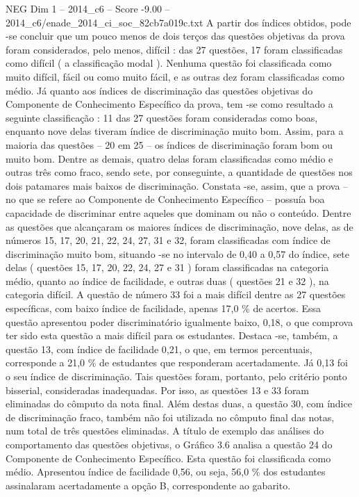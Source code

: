 \begin{textsample}{NEG Dim 1 – 2014\_c6 – Score -9.00 – 2014\_c6/enade\_2014\_ci\_soc\_82cb7a019c.txt}
A partir dos índices obtidos, pode -se concluir que um pouco menos de dois terços das questões objetivas da prova foram considerados, pelo menos, difícil : das 27 questões, 17 foram classificadas como difícil ( a classificação modal ).
Nenhuma questão foi classificada como muito difícil, fácil ou como muito fácil, e as outras dez foram classificadas como médio.
Já quanto aos índices de discriminação das questões objetivas do Componente de Conhecimento Específico da prova, tem -se como resultado a seguinte classificação : 11 das 27 questões foram consideradas como boas, enquanto nove delas tiveram índice de discriminação muito bom.
Assim, para a maioria das questões – 20 em 25 – os índices de discriminação foram bom ou muito bom.
Dentre as demais, quatro delas foram classificadas como médio e outras três como fraco, sendo sete, por conseguinte, a quantidade de questões nos dois patamares mais baixos de discriminação.
Constata -se, assim, que a prova – no que se refere ao Componente de Conhecimento Específico – possuía boa capacidade de discriminar entre aqueles que dominam ou não o conteúdo.
Dentre as questões que alcançaram os maiores índices de discriminação, nove delas, as de números 15, 17, 20, 21, 22, 24, 27, 31 e 32, foram classificadas com índice de discriminação muito bom, situando -se no intervalo de 0,40 a 0,57 do índice, sete delas ( questões 15, 17, 20, 22, 24, 27 e 31 ) foram classificadas na categoria médio, quanto ao índice de facilidade, e outras duas ( questões 21 e 32 ), na categoria difícil.
A questão de número 33 foi a mais difícil dentre as 27 questões específicas, com baixo índice de facilidade, apenas 17,0 \% de acertos.
Essa questão apresentou poder discriminatório igualmente baixo, 0,18, o que comprova ter sido esta questão a mais difícil para os estudantes.
Destaca -se, também, a questão 13, com índice de facilidade 0,21, o que, em termos percentuais, corresponde a 21,0 \% de estudantes que responderam acertadamente.
Já 0,13 foi o seu índice de discriminação.
Tais questões foram, portanto, pelo critério ponto bisserial, consideradas inadequadas.
Por isso, as questões 13 e 33 foram eliminadas do cômputo da nota final.
Além destas duas, a questão 30, com índice de discriminação fraco, também não foi utilizada no cômputo final das notas, num total de três questões eliminadas.
A título de exemplo das análises do comportamento das questões objetivas, o Gráfico 3.6 analisa a questão 24 do Componente de Conhecimento Específico.
Esta questão foi classificada como médio.
Apresentou índice de facilidade 0,56, ou seja, 56,0 \% dos estudantes assinalaram acertadamente a opção B, correspondente ao gabarito.

\end{textsample}
